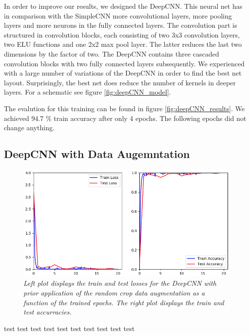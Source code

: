 \documentclass[a4paper]{article}
\begin{document}
In order to improve our results, we designed the DeepCNN. This neural net has in comparison with the SimpleCNN more convolutional layers, more pooling layers and more neurons in the fully connected layers. The convolution part is structured in convolution blocks, each consisting of two 3x3 convolution layers, two ELU functions and one 2x2 max pool layer. The latter reduces the last two dimensions by the factor of two. The DeepCNN contains three cascaded convolution blocks with two fully connected layers subsequently. We experienced with a large number of variations of the DeepCNN in order to find the best net layout. Surprisingly, the best net does reduce the number of kernels in deeper layers. For a schematic see figure \ref{fig:deepCNN_model}. 

The evalution for this training can be found in figure \ref{fig:deepCNN_results}. We achieved 94.7 \% train accuracy after only 4 epochs. The following epochs did not change anything. 

\subsection{DeepCNN with Data Augemntation}\label{sec:deepCNN_augmented}

\begin{figure}
     \centering
     \includegraphics[height=0.25\paperwidth]{graphics/nets/CNN13_with_Augmentation_Results}
     \caption{\textit{Left plot displays the train and test losses for the DeepCNN with prior application of the random crop data augmentation as a function of the trained epochs. The right plot displays the train and test accurracies.}}
     \label{fig:deepCNN_augmented}
\end{figure}

test test test test test test test test test test 
\end{document}
